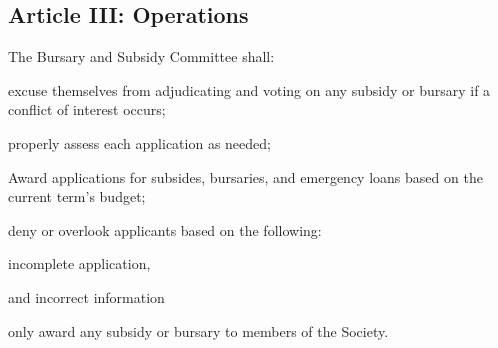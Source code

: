 \subsection{Article III: Operations}
\begin{longenum}[ label*=\thesubsection.\arabic*., align=left] 
	\item The Bursary and Subsidy Committee shall:	
		\begin{longenum}[ label*=\arabic*., align=left] 
		\item excuse themselves from adjudicating and voting on any subsidy or bursary if a conflict of interest occurs;
		\item properly assess each application as needed;
		\item Award applications for subsides, bursaries, and emergency loans based on the current term’s budget;
		\item deny or overlook applicants based on the following:
			\begin{longenum}[ label*=\arabic*., align=left]
			\item incomplete application,
			\item and incorrect information
			\end{longenum}
		\item only award any subsidy or bursary to members of the Society.	
		\end{longenum}
\end{longenum}


